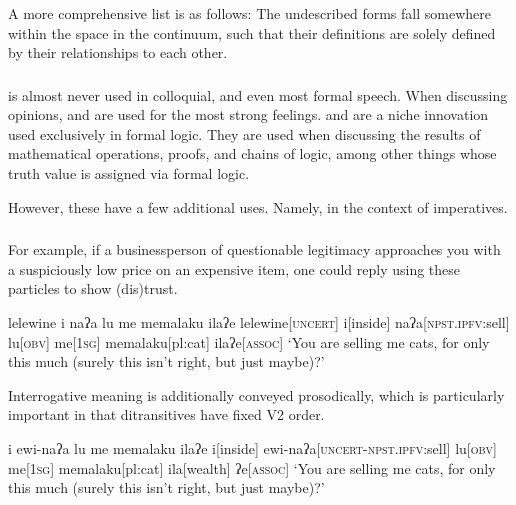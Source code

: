 A more comprehensive list is as follows:  The undescribed forms fall somewhere within the space in the continuum, such that their definitions are solely defined by their relationships to each other.

\subsubsection{}
 is almost never used in colloquial, and even most formal speech. When discussing opinions,  and  are used for the most strong feelings.  and  are a niche innovation used exclusively in formal logic. They are used when discussing the results of mathematical operations, proofs, and chains of logic, among other things whose truth value is assigned via formal logic.

However, these have a few additional uses. Namely, in the context of imperatives.

\subsubsection{}
For example, if a businessperson of questionable legitimacy approaches you with a suspiciously low price on an expensive item, one could reply using these particles to show (dis)trust.

\ex
\begingl
\glpreamble lelewine i naʔa lu me memalaku ilaʔe
\endpreamble
lelewine[\textsc{uncert}]
i[inside]
naʔa[\textsc{npst.ipfv:}sell]
lu[\textsc{obv}]
me[\textsc{1sg}]
memalaku[pl:cat]
ila\footnotemark[wealth]
ʔe[\textsc{assoc}]
\glft `You are selling me cats, for only this much (surely this isn't right, but just maybe)?'
\endgl
\xe

Interrogative meaning is additionally conveyed prosodically, which is particularly important in that ditransitives have fixed V2 order.


\begingl
\glpreamble i ewi-naʔa lu me memalaku ilaʔe
\endpreamble
i[inside]
ewi-naʔa[\textsc{uncert-npst.ipfv:}sell]
lu[\textsc{obv}]
me[\textsc{1sg}]
memalaku[pl:cat]
ila[wealth]
ʔe[\textsc{assoc}]
\glft `You are selling me cats, for only this much (surely this isn't right, but just maybe)?'
\endgl
\xe

